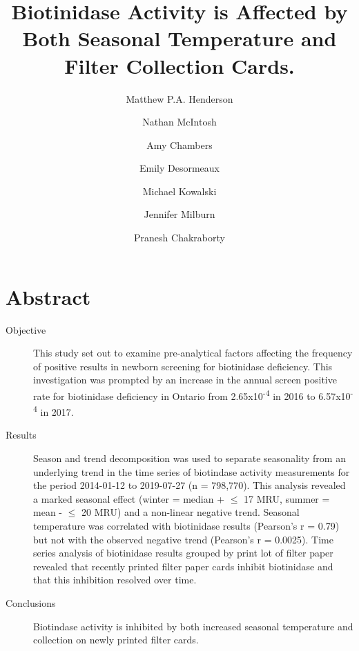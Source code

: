 \documentclass[review]{elsarticle}
\date{}
\title{}
\begin{document}
\makeatletter
\newcommand{\citeprocitem}[2]{\hyper@linkstart{cite}{citeproc_bib_item_#1}#2\hyper@linkend}
\makeatother



\begin{frontmatter}
\title{Biotinidase Activity is Affected by Both Seasonal Temperature and Filter Collection Cards.}
\author[NSO, UoO]{Matthew P.A. Henderson}
\author[NSO]{Nathan McIntosh}
\author[NSO]{Amy Chambers}
\author[NSO]{Emily Desormeaux}
\author[NSO]{Michael Kowalski}
\author[NSO]{Jennifer Milburn}
\author[NSO, UO]{Pranesh Chakraborty}
\address[NSO]{Newborn Screening Ontario, Children's Hospital of Eastern Ontario}
\address[UoO]{Department of Medicine, University of Ottawa} 
\end{frontmatter}

\section*{Abstract}
\label{sec:org9cbaae7}
\begin{description}
\item[{Objective}] This study set out to examine pre-analytical factors
affecting the frequency of positive results in newborn screening for
biotinidase deficiency. This investigation was prompted by an
increase in the annual screen positive rate for biotinidase deficiency
in Ontario from 2.65x10\textsuperscript{-4} in 2016 to 6.57x10\textsuperscript{-4} in 2017.

\item[{Results}] Season and trend decomposition was used to separate
seasonality from an underlying trend in the time series of
biotindase activity measurements for the period 2014-01-12 to
2019-07-27 (n = 798,770). This analysis revealed a marked seasonal
effect (winter = median + \(\le\) 17 MRU, summer = mean - \(\le\) 20 MRU)
and a non-linear negative trend. Seasonal temperature was correlated
with biotinidase results (Pearson's r = 0.79) but not with the
observed negative trend (Pearson's r = 0.0025). Time series analysis
of biotinidase results grouped by print lot of filter paper revealed
that recently printed filter paper cards inhibit biotinidase and
that this inhibition resolved over time.

\item[{Conclusions}] Biotindase activity is inhibited by both increased
seasonal temperature and collection on newly printed filter cards.
\end{description}
\end{document}
